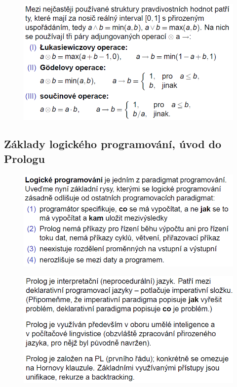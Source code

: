 \documentclass[10pt,a4paper]{article}
\theoremstyle{note}
\begin{document}
			\begin{figure}[H]
			\centering
			\includegraphics[width=13cm]{img/fuzzy4.png}
			\end{figure}


	\subsection{Základy logického programování, úvod do Prologu}

			\begin{figure}[H]
			\centering
			\includegraphics[width=13cm]{img/prolog1.png}
			\end{figure}

			\begin{figure}[H]
			\centering
			\includegraphics[width=13cm]{img/prolog2.png}
			\end{figure}
\end{document}

